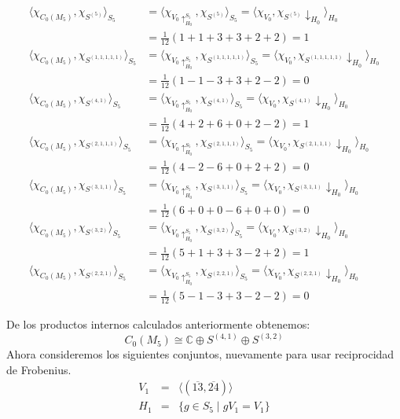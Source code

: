 \documentclass[12pt]{book}
\theoremstyle{definition}
\newcounter{in}
\begin{document}
{\scriptsize
  \begin{align*}
    \langle\chi_{C_{0}(M_{5})},\chi_{S^{(5)}}\rangle_{S_{5}}&=\langle\chi_{V_{0}\uparrow^{S_{5}}_{H_0}},\chi_{S^{(5)}}\rangle_{S_{5}}=\langle\chi_{V_{0}},\chi_{S^{(5)}}\downarrow_{H_{0}}\rangle_{H_{0}}\\ 
    &=\frac{1}{12}(1+1+3+3+2+2)=1\\ 
    \langle\chi_{C_{0}(M_{5})},\chi_{S^{(1,1,1,1,1)}}\rangle_{S_{5}}&=\langle\chi_{V_{0}\uparrow^{S_{5}}_{H_0}},\chi_{S^{(1,1,1,1,1)}}\rangle_{S_{5}}=\langle\chi_{V_{0}},\chi_{S^{(1,1,1,1,1)}}\downarrow_{H_{0}}\rangle_{H_{0}}\\
    &=\frac{1}{12}(1-1-3+3+2-2)=0 \\
    \langle\chi_{C_{0}(M_{5})},\chi_{S^{(4,1)}}\rangle_{S_{5}}&=\langle\chi_{V_{0}\uparrow^{S_{5}}_{H_0}},\chi_{S^{(4,1)}}\rangle_{S_{5}}=\langle\chi_{V_{0}},\chi_{S^{(4,1)}}\downarrow_{H_{0}}\rangle_{H_{0}}\\
    &=\frac{1}{12}(4+2+6+0+2-2)=1 \\
    \langle\chi_{C_{0}(M_{5})},\chi_{S^{(2,1,1,1)}}\rangle_{S_{5}}&=\langle\chi_{V_{0}\uparrow^{S_{5}}_{H_0}},\chi_{S^{(2,1,1,1)}}\rangle_{S_{5}}=\langle\chi_{V_{0}},\chi_{S^{(2,1,1,1)}}\downarrow_{H_{0}}\rangle_{H_{0}}\\
    &=\frac{1}{12}(4-2-6+0+2+2)=0 \\
    \langle\chi_{C_{0}(M_{5})},\chi_{S^{(3,1,1)}}\rangle_{S_{5}}&=\langle\chi_{V_{0}\uparrow^{S_{5}}_{H_0}},\chi_{S^{(3,1,1)}}\rangle_{S_{5}}=\langle\chi_{V_{0}},\chi_{S^{(3,1,1)}}\downarrow_{H_{0}}\rangle_{H_{0}}\\
    &=\frac{1}{12}(6+0+0-6+0+0)=0 \\
    \langle\chi_{C_{0}(M_{5})},\chi_{S^{(3,2)}}\rangle_{S_{5}}&=\langle\chi_{V_{0}\uparrow^{S_{5}}_{H_0}},\chi_{S^{(3,2)}}\rangle_{S_{5}}=\langle\chi_{V_{0}},\chi_{S^{(3,2)}}\downarrow_{H_{0}}\rangle_{H_{0}}\\
    &=\frac{1}{12}(5+1+3+3-2+2)=1 \\
    \langle\chi_{C_{0}(M_{5})},\chi_{S^{(2,2,1)}}\rangle_{S_{5}}&=\langle\chi_{V_{0}\uparrow^{S_{5}}_{H_0}},\chi_{S^{(2,2,1)}}\rangle_{S_{5}}=\langle\chi_{V_{0}},\chi_{S^{(2,2,1)}}\downarrow_{H_{0}}\rangle_{H_{0}}\\
    &=\frac{1}{12}(5-1-3+3-2-2)=0 
  \end{align*}}

De los productos internos calculados anteriormente obtenemos:
\begin{equation}
  \label{eq:C0-M5}
  C_{0}(M_{5})\cong \mathbb{C}\oplus S^{(4,1)} \oplus S^{(3,2)} 
\end{equation}
Ahora consideremos los siguientes conjuntos, nuevamente para usar
reciprocidad de Frobenius.
\begin{eqnarray*}
  V_{1}&=&\langle(\overline{13},\overline{24})\rangle\\
  H_{1}&=&\{g\in S_{5}\mid gV_{1}=V_{1}\}
\end{eqnarray*}
\end{document}
